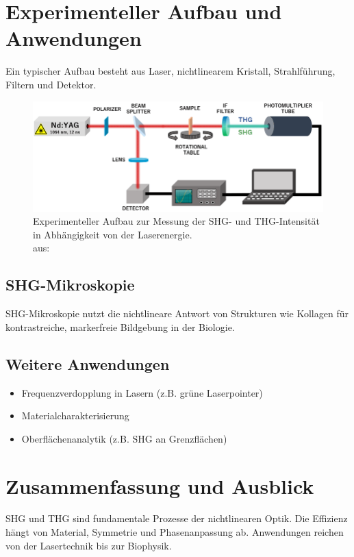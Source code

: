 \documentclass[9pt,a4paper,twocolumn,twoside]{tau-class/tau}
\newcommand{\figciteweburl}[1]{\\[-3mm]{\tiny aus: \citeauthortitleurl{#1}}}
\begin{document}

\section{Experimenteller Aufbau und Anwendungen}
Ein typischer Aufbau besteht aus Laser, nichtlinearem Kristall, Strahlführung, Filtern und Detektor.

\begin{figure}[!ht]
\centering
\includegraphics[width=0.95\columnwidth]{../praes/Images/Experimental-setup-measuring-SHG-and-THG-intensity-relative-to-laser-energy.png}
\caption{Experimenteller Aufbau zur Messung der SHG- und THG-Intensität in Abhängigkeit von der Laserenergie.\figciteweburl{ResearchGate2025}}
\end{figure}

\subsection{SHG-Mikroskopie}
SHG-Mikroskopie nutzt die nichtlineare Antwort von Strukturen wie Kollagen für kontrastreiche, markerfreie Bildgebung in der Biologie.

\subsection{Weitere Anwendungen}
\begin{itemize}
    \item Frequenzverdopplung in Lasern (z.B. grüne Laserpointer)
    \item Materialcharakterisierung
    \item Oberflächenanalytik (z.B. SHG an Grenzflächen)
\end{itemize}


\section{Zusammenfassung und Ausblick}
SHG und THG sind fundamentale Prozesse der nichtlinearen Optik. Die Effizienz hängt von Material, Symmetrie und Phasenanpassung ab. Anwendungen reichen von der Lasertechnik bis zur Biophysik.
\end{document}
